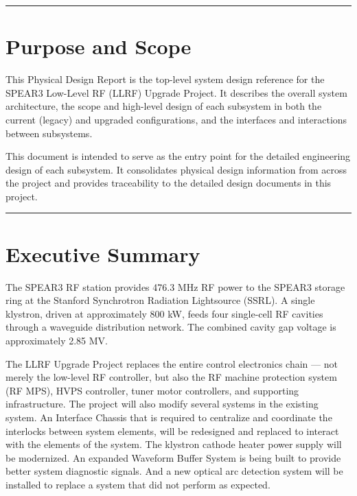 \begin{center}\rule{0.5\linewidth}{0.5pt}\end{center}

\section*{Purpose and Scope}\label{sec:purpose}

This Physical Design Report is the top-level system design reference for the SPEAR3 Low-Level RF (LLRF) Upgrade Project. It describes the overall system architecture, the scope and high-level design of each subsystem in both the current (legacy) and upgraded configurations, and the interfaces and interactions between subsystems.

This document is intended to serve as the entry point for the detailed engineering design of each subsystem. It consolidates physical design information from across the project and provides traceability to the detailed design documents in this project.

\begin{center}\rule{0.5\linewidth}{0.5pt}\end{center}

\section{Executive Summary}\label{executive-summary}

The SPEAR3 RF station provides 476.3 MHz RF power to the SPEAR3 storage ring at the Stanford Synchrotron Radiation Lightsource (SSRL). A single klystron, driven at approximately 800 kW, feeds four single-cell RF cavities through a waveguide distribution network. The combined cavity gap voltage is approximately 2.85 MV.

The LLRF Upgrade Project replaces the entire control electronics chain --- not merely the low-level RF controller, but also the RF machine protection system (RF MPS), HVPS controller, tuner motor controllers, and supporting infrastructure. The project will also modify several systems in the existing system. An Interface Chassis that is required to centralize and coordinate the interlocks between system elements, will be redesigned and replaced to interact with the elements of the system. The klystron cathode heater power supply will be modernized. An expanded Waveform Buffer System is being built to provide better system diagnostic signals. And a new optical arc detection system will be installed to replace a system that did not perform as expected.

